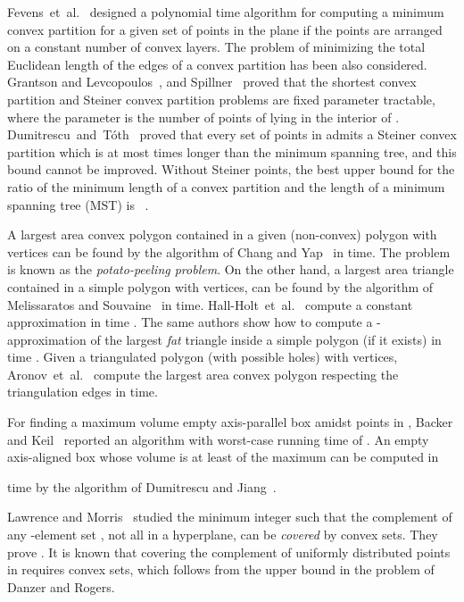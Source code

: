 \documentclass[11pt]{article}
\def\etal{{et~al.}}
\begin{document}
Fevens~\etal~\cite{FMR01} designed a polynomial time algorithm for
computing a minimum convex partition for a given set of  points in
the plane if the points are arranged on a constant number of convex
layers.
The problem of minimizing the total Euclidean length of the edges of a
convex partition has been also considered.  Grantson and
Levcopoulos~\cite{GN06}, and Spillner~\cite{Sp08} proved that the
shortest convex partition and Steiner convex partition problems are
fixed parameter tractable, where the parameter is the number of points
of  lying in the interior of .
Dumitrescu~and~T\'oth~\cite{DT11} proved that every set of  points in 
admits a Steiner convex partition which is at most  times longer than the minimum spanning tree, and this bound cannot
be improved. Without Steiner points, the best upper bound for the
ratio of the minimum length of a convex partition and the length of a
minimum spanning tree (MST) is ~\cite{Ki80}.

A largest area convex polygon contained in a given (non-convex) polygon
with  vertices can be found by the  algorithm of Chang and
Yap~\cite{CY86} in  time. The problem is known as the
\emph{potato-peeling problem}.
On the other hand, a largest area triangle contained in a simple polygon
with  vertices, can be found by the  algorithm of Melissaratos and
Souvaine~\cite{ms-sphsg-92} in  time.
Hall-Holt~\etal~\cite{hkkms-flspp-06} compute a constant approximation
in time . The same authors show how to compute a
-approximation of the largest \emph{fat} triangle inside a
simple polygon (if it exists) in time . Given a triangulated
polygon (with possible holes) with  vertices, Aronov~\etal~\cite{AKLS11}
compute the largest area  convex polygon respecting the triangulation edges
in  time.

For finding a maximum volume empty axis-parallel box amidst  points
in , Backer and Keil~\cite{BK10} reported an algorithm with
worst-case running time of . An empty
axis-aligned box whose volume is at least  of the maximum
can be computed in

time by the algorithm of Dumitrescu and Jiang~\cite{DJ12}.

Lawrence and Morris~\cite{LM09} studied the minimum integer 
such that the complement  of any -element set
, not all in a hyperplane, can be \emph{covered} by
 convex sets.  They prove .
It is known that covering the complement of  uniformly distributed points
in  requires  convex sets, which
follows from the upper bound in the problem of Danzer and Rogers.
\end{document}
